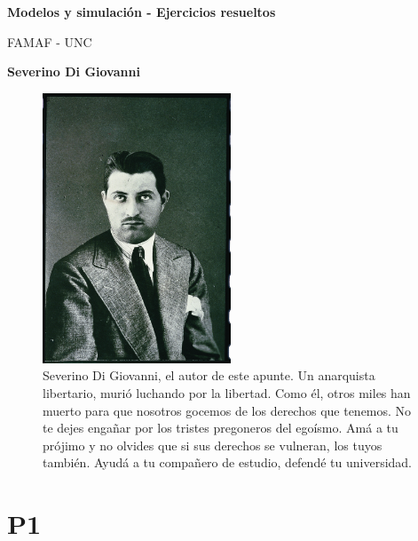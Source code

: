 \documentclass[a4paper, 12pt]{article}
\begin{document}
\begin{titlepage}
   \begin{center}
       \vspace*{1cm}

       \textbf{Modelos y simulación - Ejercicios resueltos}

       \small
       \vspace{0.5cm}
        FAMAF - UNC
            
       \vspace{1.5cm}
       \footnotesize
       \textbf{Severino Di Giovanni}
       \normalsize

       \vfill
            
            
     
   \end{center}
\end{titlepage}

 \begin{figure}[h!]
 \centering
  \includegraphics[width=0.5\textwidth]{../Images/SeverinoDiGiovanni.jpg}
 \caption{Severino Di Giovanni, el autor de este apunte. Un anarquista
   libertario, murió luchando por la libertad. Como él, otros miles han muerto
   para que nosotros gocemos de los derechos que tenemos. No te dejes engañar
   por los tristes pregoneros del egoísmo. Amá a tu prójimo y no olvides que si
   sus derechos se vulneran, los tuyos también. Ayudá a tu compañero de estudio,
 defendé tu universidad. }
 \end{figure}

\pagebreak

\tableofcontents
\newpage


\section{P1} 
\end{document}
